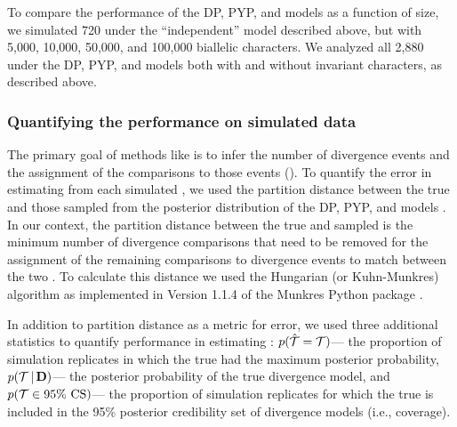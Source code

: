 \documentclass[letterpaper,12pt]{article}
\begin{document}
To compare the performance of the DP, PYP, and \wunif models as a function of
\dataset size, we simulated 720
\datasets under the ``independent'' model described above, but
with 5,000, 10,000, 50,000, and 100,000 biallelic characters.
We analyzed all 2,880 \datasets under the DP, PYP, and \wunif models
both with and without invariant characters, as
described above.

\subsubsection{Quantifying the performance on simulated data}

The primary goal of methods like \ecoevolity is to infer the number of
divergence events and the assignment of the comparisons to those events
(\etimesets).
To quantify the error in estimating \etimesets from each simulated \dataset, we
used the partition distance between the true \etimesets and those sampled from
the posterior distribution of the DP, PYP, and \wunif models
\citep{Regnier1983,Gusfield2002}.
In our context, the partition distance between the true and sampled \etimesets
is the minimum number of divergence comparisons that need to be removed for the
assignment of the remaining comparisons to divergence events to match between
the two \etimesets.
To calculate this distance we used the Hungarian (or Kuhn-Munkres) algorithm
\citep{Kuhn1955,Munkres1957}
as implemented in Version 1.1.4 of the Munkres Python package
\citep{Clapper2020}.

In addition to partition distance as a metric for \etimesets error, we used
three additional statistics to quantify performance in estimating \etimesets:
$p(\hat{\mathcal{T}} =\mathcal{T})$---
    the proportion of simulation replicates in which the true \etimesets had
    the maximum posterior probability,
$p(\mathcal{T} \,|\, \mathbf{D})$---
    the posterior probability of the true divergence model,
and
$p(\mathcal{T} \in \textrm{95\% CS})$---
    the proportion of simulation replicates for which the true \etimesets is
    included in the 95\% posterior credibility set of divergence models (i.e.,
    coverage).
\end{document}
